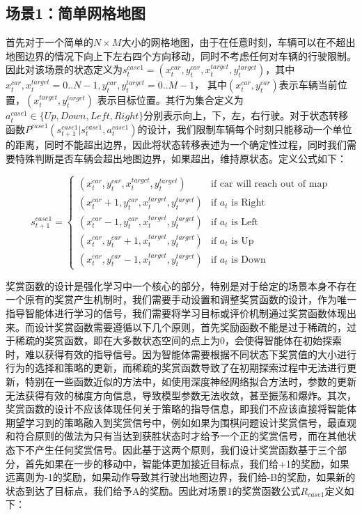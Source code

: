\documentclass{standalone}
\begin{document}
\subsection{场景1：简单网格地图}
首先对于一个简单的$N \times M$大小的网格地图，由于在任意时刻，车辆可以在不超出地图边界的情况下向上下左右四个方向移动，同时不考虑任何对车辆的行驶限制。因此对该场景的状态定义为$s_t^{case1} = (x_t^{car}, y_t^{car}, x^{target}_t, y^{target}_t)$，其中 $x_t^{car}, x^{target}_t=0..N-1, y_t^{car}, y^{target}_t=0..M-1$， 其中$(x_t^{car}, y_t^{car})$表示车辆当前位置，$(x^{target}_t, y^{target}_t)$ 表示目标位置。其行为集合定义为$a_t^{case1} \in \{Up, Down, Left, Right\}$分别表示向上，下，左，右行驶。对于状态转移函数$P^{case1}{(s_{t+1}^{case1}|s_t^{case1}, a_t^{case1})}$的设计，我们限制车辆每个时刻只能移动一个单位的距离，同时不能超出边界，因此将状态转移表述为一个确定性过程，同时我们需要特殊判断是否车辆会超出地图边界，如果超出，维持原状态。定义公式如下：
\begin{center}
    \begin{equation}
    s_{t+1}^{case1} = \begin{cases}
    (x_t^{car}, y_t^{car}, x^{target}_t, y^{target}_t) &\mbox{if car will reach out of map}\\
    (x_t^{car} + 1, y_t^{car}, x^{target}_t, y^{target}_t) &\mbox{if $a_t$ is Right}\\
    (x_t^{car} - 1, y_t^{car}, x^{target}_t, y^{target}_t) &\mbox{if $a_t$ is Left}\\
    (x_t^{car}, y_t^{car} + 1, x^{target}_t, y^{target}_t) &\mbox{if $a_t$ is Up}\\
    (x_t^{car}, y_t^{car} - 1, x^{target}_t, y^{target}_t) &\mbox{if $a_t$ is Down}
    \end{cases}
\end{equation}
\end{center}
奖赏函数的设计是强化学习中一个核心的部分，特别是对于给定的场景本身不存在一个原有的奖赏产生机制时，我们需要手动设置和调整奖赏函数的设计，作为唯一指导智能体进行学习的信号，我们需要将学习目标或评价机制通过奖赏函数体现出来。而设计奖赏函数需要遵循以下几个原则，首先奖励函数不能是过于稀疏的，过于稀疏的奖赏函数，即在大多数状态空间的点上为0，会使得智能体在初始探索时，难以获得有效的指导信号。因为智能体需要根据不同状态下奖赏值的大小进行行为的选择和策略的更新，而稀疏的奖赏函数导致了在初期探索过程中无法进行更新，特别在一些函数近似的方法中，如使用深度神经网络拟合方法时，参数的更新无法获得有效的梯度方向信息，导致模型参数无法收敛，甚至振荡和爆炸。其次，奖赏函数的设计不应该体现任何关于策略的指导信息，即我们不应该直接将智能体期望学习到的策略融入到奖赏信号中，例如如果为围棋问题设计奖赏信号，最直观和符合原则的做法为只有当达到获胜状态时才给予一个正的奖赏信号，而在其他状态下不产生任何奖赏信号。因此基于这两个原则，我们设计奖赏函数基于三个部分，首先如果在一步的移动中，智能体更加接近目标点，我们给+1的奖励，如果远离则为-1的奖励，如果动作导致其行驶出地图边界，我们给-B的奖励，如果新的状态到达了目标点，我们给予A的奖励。因此对场景1的奖赏函数公式$R_{case1}$定义如下：
\end{document}
